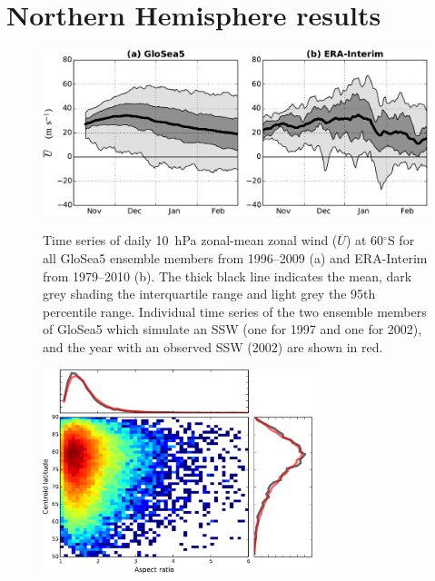 \section{Northern Hemisphere results}


\begin{figure}[t]
  \noindent\includegraphics[width=\textwidth,angle=0]{figures/chapter-seasonal/zmzw_climatologies_nh.pdf}\\
  \caption[Comparison of GloSea5 and ERA-Interim zonal-mean zonal wind
climatologies.]{Time series of daily 10~hPa zonal-mean zonal wind
($\overline{U}$) at 60$^{\circ}$S for all GloSea5 ensemble members from
1996--2009 (a) and ERA-Interim from 1979--2010 (b). The thick black line
indicates the mean, dark grey shading the interquartile range and light grey the
95th percentile range. Individual time series of the two ensemble members of
GloSea5 which simulate an SSW (one for 1997 and one for 2002), and the year with
an observed SSW (2002) are shown in red.}\label{fig:sh_zmzw_clim}
\end{figure}

\begin{figure}[t] \centering
  \noindent\includegraphics[width=0.7\textwidth,angle=0]{figures/chapter-seasonal/GloSea_moments_histogram.pdf}\\
  \caption[]{}\label{fig:sh_zmzw_clim}
\end{figure}


